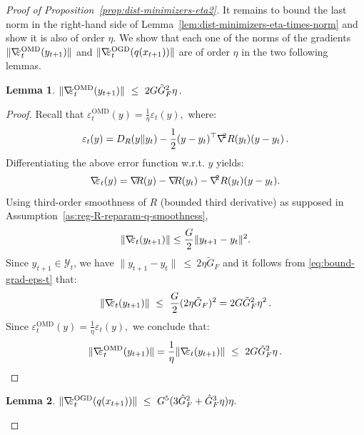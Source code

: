 \documentclass[a4paper,11pt,fullpage]{article}
\def\Y{{\mathcal Y}}
\theoremstyle{plain}
\newtheorem{lemma}{Lemma}
\theoremstyle{definition}
\theoremstyle{plain}
\renewcommand{\leq}{~\le~}
\let\nablaold\nabla
\renewcommand{\nabla}{\nablaold\mkern-2.5mu}
\begin{document}
\begin{proof}[Proof of Proposition~\ref{prop:dist-minimizers-eta2}]
It remains to bound the last norm in the right-hand side of Lemma~\ref{lem:dist-minimizers-eta-times-norm} and show it is also of order $\eta$. We show that each one of the norms of the gradients $\|\nabla\varepsilon_t^{\mathrm{OMD}}(y_{t+1})\|$ and $\|\nabla\varepsilon_t^{\mathrm{OGD}}(q(x_{t+1}))\|$ are of order $\eta$ in the two following lemmas. 

\begin{tcolorbox}[colframe=white!, top=2pt,left=2pt,right=2pt,bottom=2pt] 
\begin{lemma}
\label{lem:norm-grad-eps-OMD}
$\|\nabla \varepsilon_t^{\mathrm{OMD}}(y_{t+1})\| \leq 2 G \tilde{G}_F^2 \eta\,.$
\end{lemma}
\end{tcolorbox}

\begin{proof}
Recall that $\varepsilon_t^{\mathrm{OMD}}(y)=\frac1\eta \varepsilon_t(y),$
where: 
\begin{equation*}
\varepsilon_t(y)
=
D_R(y\|y_t)-\frac12(y-y_t)^\top \nabla^2R(y_t)(y-y_t)\,.
\end{equation*}
Differentiating the above error function w.r.t. $y$ yields: 
\begin{equation*}
\nabla \varepsilon_t(y)
=
\nabla R(y)-\nabla R(y_t)-\nabla^2R(y_t)(y-y_t).
\end{equation*}
Using third-order smoothness of $R$ (bounded third derivative) as supposed in Assumption~\ref{as:reg-R-reparam-q-smoothness},
\begin{equation}
\label{eq:bound-grad-eps-t}
\|\nabla \varepsilon_t(y_{t+1})\|
\le
\frac{G}{2}\|y_{t+1}-y_t\|^2.
\end{equation}
Since $y_{t+1}\in \Y_t$, we have $\|y_{t+1}-y_t\| \leq 2\eta \tilde{G}_F$ and it follows from \eqref{eq:bound-grad-eps-t} that: 
\begin{equation*}
\|\nabla \varepsilon_t(y_{t+1})\| \leq \frac{G}{2} (2\eta \tilde{G}_F)^2 = 2 G \tilde{G}_F^2 \eta^2\,.
\end{equation*}
Since $\varepsilon_t^{\mathrm{OMD}}(y)=\frac1\eta \varepsilon_t(y),$ we conclude that: 
\begin{equation*}
\|\nabla \varepsilon_t^{\mathrm{OMD}}(y_{t+1})\|
= \frac 1 \eta \|\nabla \varepsilon_t(y_{t+1})\| 
\leq 2 G \tilde{G}_F^2 \eta\,.
\end{equation*}
\end{proof}

\begin{tcolorbox}[colframe=white!, top=2pt,left=2pt,right=2pt,bottom=2pt] 
\begin{lemma}
\label{lem:norm-grad-eps-OGD}
$\|\nabla\varepsilon_t^{\mathrm{OGD}}(q(x_{t+1}))\| \leq G^5 (3\hat{G}_F^2 + \hat{G}_F^3 \eta) \eta.$
\end{lemma}
\end{tcolorbox}


\end{proof}
\end{document}
